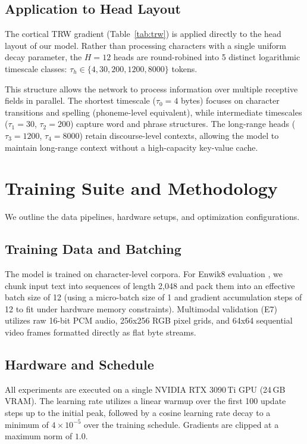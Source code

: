 \documentclass{article}
\begin{document}
\subsection{Application to Head Layout}
\label{sec:hierarchical_app}

The cortical TRW gradient (Table~\ref{tab:trw}) is applied directly to the head layout of our model. Rather than processing characters with a single uniform decay parameter, the $H=12$ heads are round-robined into 5 distinct logarithmic timescale classes: $\tau_h \in \{4, 30, 200, 1200, 8000\}$ tokens.

This structure allows the network to process information over multiple receptive fields in parallel. The shortest timescale ($\tau_0 = 4$ bytes) focuses on character transitions and spelling (phoneme-level equivalent), while intermediate timescales ($\tau_1 = 30$, $\tau_2 = 200$) capture word and phrase structures. The long-range heads ($\tau_3 = 1200$, $\tau_4 = 8000$) retain discourse-level contexts, allowing the model to maintain long-range context without a high-capacity key-value cache.

\section{Training Suite and Methodology}
\label{sec:training}

We outline the data pipelines, hardware setups, and optimization configurations.

\subsection{Training Data and Batching}
The model is trained on character-level corpora. For Enwik8 evaluation \cite{hutter2012enwik8}, we chunk input text into sequences of length 2{,}048 and pack them into an effective batch size of 12 (using a micro-batch size of 1 and gradient accumulation steps of 12 to fit under hardware memory constraints). Multimodal validation (E7) utilizes raw 16-bit PCM audio, 256x256 RGB pixel grids, and 64x64 sequential video frames formatted directly as flat byte streams.

\subsection{Hardware and Schedule}
All experiments are executed on a single NVIDIA RTX 3090\,Ti GPU (24\,GB VRAM). The learning rate utilizes a linear warmup over the first 100 update steps up to the initial peak, followed by a cosine learning rate decay to a minimum of $4 \times 10^{-5}$ over the training schedule. Gradients are clipped at a maximum norm of $1.0$.
\end{document}
